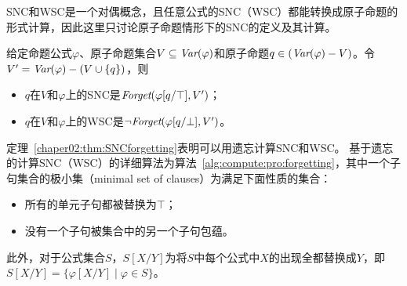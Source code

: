 SNC和WSC是一个对偶概念，且任意公式的SNC（WSC）都能转换成原子命题的形式计算\cite{DBLP:journals/ai/Lin01}，因此这里只讨论原子命题情形下的SNC的定义及其计算。%

\begin{theorem}\label{chaper02:thm:SNCforgetting}
	给定命题公式$\varphi$、原子命题集合$V\subseteq \textit{Var}(\varphi)$和原子命题$q\in (\textit{Var}(\varphi)-V)$。令$V'= \textit{Var}(\varphi) - (V\cup \{q\})$，则
	\begin{itemize}
		\item $q$在$V$和$\varphi$上的SNC是$\textit{Forget}(\varphi[q/\top], V')$；
		\item $q$在$V$和$\varphi$上的WSC是$\neg \textit{Forget}(\varphi[q/\bot], V')$。
	\end{itemize}
\end{theorem}


定理~\ref{chaper02:thm:SNCforgetting}表明可以用遗忘计算SNC和WSC。
基于遗忘的计算SNC（WSC）的详细算法为算法~\ref{alg:compute:pro:forgetting}，其中一个子句集合的极小集（minimal set of clauses）为满足下面性质的集合：
\begin{itemize}
	\item 所有的单元子句都被替换为$\top$；
	\item 没有一个子句被集合中的另一个子句包蕴。
\end{itemize}
此外，对于公式集合$S$，$S[X/Y]$为将$S$中每个公式中$X$的出现全都替换成$Y$，即$S[X/Y]=\{\varphi[X/Y]\mid \varphi\in S\}$。

